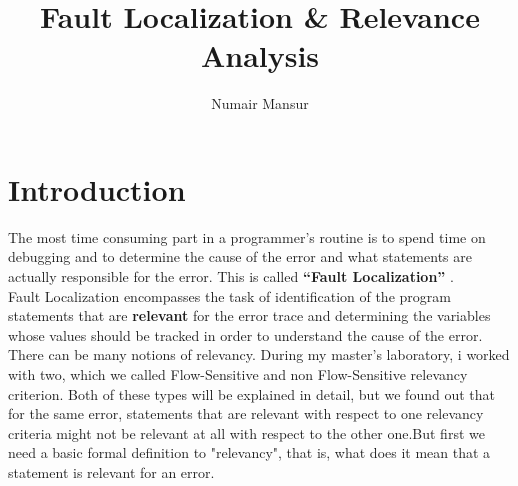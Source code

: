 \documentclass{article}
\title{Fault Localization \& Relevance Analysis }
\author{Numair Mansur}
\begin{document}
\maketitle
\section{Introduction}
The most time consuming part in a programmer’s routine is to spend time on debugging and to determine the cause of the error and what statements are actually responsible for the error. This is called \textbf{“Fault Localization”} . 
\\
Fault Localization encompasses the task of identification of the program statements that are \textbf{relevant}  for the error trace and determining the variables whose values should be tracked in order to understand the cause of the error. 
\\
There can be many notions of relevancy. During my master’s laboratory, i worked with two, which we called Flow-Sensitive and non Flow-Sensitive relevancy criterion. Both of these types will be explained in detail, but we found out that for the same error, statements that are relevant with respect to one relevancy criteria might not be relevant at all with respect to the other one.But first we need a basic formal definition to "relevancy", that is, what does it mean that a statement is relevant for an error.
\end{document}
